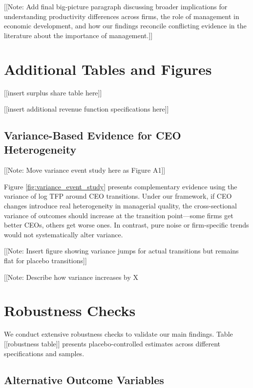 \documentclass[11pt,a4paper]{article}
\begin{document}
[[Note: Add final big-picture paragraph discussing broader implications for understanding productivity differences across firms, the role of management in economic development, and how our findings reconcile conflicting evidence in the literature about the importance of management.]]




\appendix

\section{Additional Tables and Figures}

[[insert surplus share table here]]

[[insert additional revenue function specifications here]]

\subsection{Variance-Based Evidence for CEO Heterogeneity}

[[Note: Move variance event study here as Figure A1]]

Figure \ref{fig:variance_event_study} presents complementary evidence using the variance of log TFP around CEO transitions. Under our framework, if CEO changes introduce real heterogeneity in managerial quality, the cross-sectional variance of outcomes should increase at the transition point—some firms get better CEOs, others get worse ones. In contrast, pure noise or firm-specific trends would not systematically alter variance.

[[Note: Insert figure showing variance jumps for actual transitions but remains flat for placebo transitions]]

[[Note: Describe how variance increases by X%

\section{Robustness Checks}

We conduct extensive robustness checks to validate our main findings. Table [[robustness table]] presents placebo-controlled estimates across different specifications and samples.

\subsection{Alternative Outcome Variables}
\end{document}
